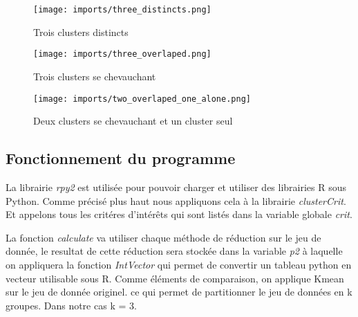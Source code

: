 \begin{center}
    \begin{figure}[ht!]
        \centering
        
        \texttt{[image: imports/three\_distincts.png]}
        
        \caption{Trois clusters distincts}
    \end{figure}
\end{center}

\begin{center}
    \begin{figure}[ht!]
        \centering
        
        \texttt{[image: imports/three\_overlaped.png]}
        
        \caption{Trois clusters se chevauchant}
    \end{figure}
\end{center}


\begin{center}
    \begin{figure}[ht!]
        \centering
        
        \texttt{[image: imports/two\_overlaped\_one\_alone.png]}
        
        \caption{Deux clusters se chevauchant et un cluster seul}
    \end{figure}
\end{center}




\subsection{Fonctionnement du programme}
La librairie \textit{rpy2} est utilisée pour pouvoir charger et utiliser des librairies R sous Python. Comme précisé plus haut
nous appliquons cela à la librairie \textit{clusterCrit}. Et appelons tous les critéres d'intérêts qui sont listés dans la variable globale \textit{crit}.

La fonction \textit{calculate} va utiliser chaque méthode de réduction sur le jeu de donnée, le resultat de cette réduction sera stockée dans
la variable \textit{p2} à laquelle on appliquera la fonction \textit{IntVector} qui permet de convertir un tableau python en vecteur utilisable sous R. 
Comme éléments de comparaison, on applique Kmean sur le jeu de donnée originel. ce qui permet de partitionner le jeu de données en k groupes. 
Dans notre cas k = 3.

